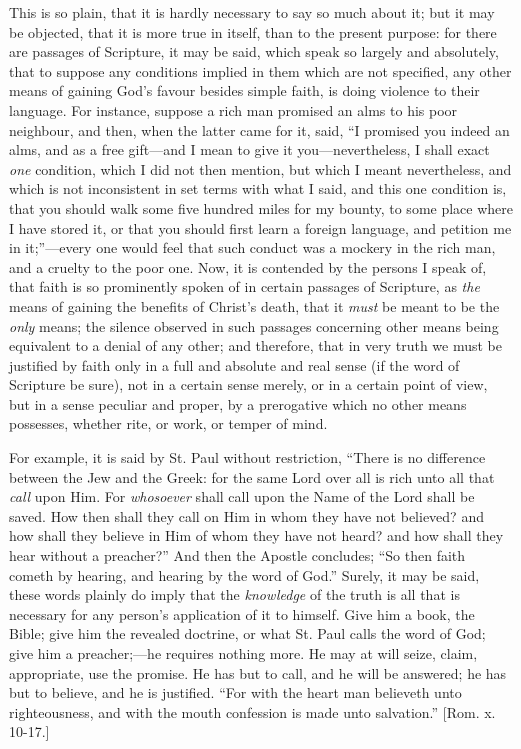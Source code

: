 This is so plain, that it is hardly necessary to say so much about
it; but it may be objected, that it is more true in itself, than to
the present purpose: for there are passages of Scripture, it may be
said, which speak so largely and absolutely, that to suppose any
conditions implied in them which are not specified, any other means of
gaining God's favour besides simple faith, is doing violence to their
language. For instance, suppose a rich man promised an alms to his
poor neighbour, and then, when the latter came for it, said, ``I
promised you indeed an alms, and as a free gift—and I mean to give
it you—nevertheless, I shall exact \emph{one} condition, which I did
not then mention, but which I meant nevertheless, and which is not
inconsistent in set terms with what I said, and this one condition is,
that you should walk some five hundred miles for my bounty, to some
place where I have stored it, or that you should first learn a foreign
language, and petition me in it;''—every one would feel that
such conduct was a mockery in the rich man, and a cruelty to the poor
one. Now, it is contended by the persons I speak of, that faith is so
prominently spoken of in certain passages of Scripture, as \emph{the}
means of gaining the benefits of Christ's death, that it \emph{must}
be meant to be the \emph{only} means; the silence observed in such
passages concerning other means being equivalent to a denial of any
other; and therefore, that in very truth we must be justified by faith
only in a full and absolute and real sense (if the word of Scripture
be sure), not in a certain sense merely, or in a certain point of
view, but in a sense peculiar and proper, by a prerogative which no
other means possesses, whether rite, or work, or temper of mind.

For example, it is said by St. Paul without restriction,
``There is no difference between the Jew and the Greek: for the
same Lord over all is rich unto all that \emph{call} upon Him. For \emph{whosoever}
shall call upon the Name of the Lord shall be saved. How then shall
they call on Him in whom they have not believed? and how shall they
believe in Him of whom they have not heard? and how shall they hear
without a preacher?'' And then the Apostle concludes; ``So
then faith cometh by hearing, and hearing by the word of God.''
Surely, it may be said, these words plainly do imply that the \emph{knowledge}
of the truth is all that is necessary for any person's application of
it to himself. Give him a book, the Bible; give him the revealed
doctrine, or what St. Paul calls the word of God; give him a preacher;—he
requires nothing more. He may at will seize, claim, appropriate, use
the promise. He has but to call, and he will be answered; he has but
to believe, and he is justified. ``For with the heart man
believeth unto righteousness, and with the mouth confession is made
unto salvation.'' [Rom. x. 10-17.]

